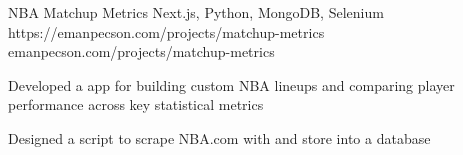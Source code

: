 
\projheader
{NBA Matchup Metrics}
{Next.js, Python, MongoDB, Selenium}
{https://emanpecson.com/projects/matchup-metrics}
{emanpecson.com/projects/matchup-metrics}

\begin{bullets}
	\item Developed a  app for building custom NBA lineups and comparing player performance across key statistical metrics

	\item Designed a  script to scrape NBA.com with  and store  into a  database
\end{bullets}

